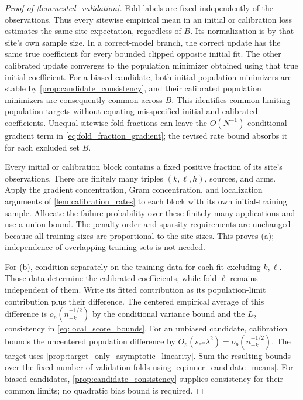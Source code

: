 \documentclass[12pt]{article}
\begin{document}
\begin{proof}[Proof of \cref{lem:nested_validation}]
Fold labels are fixed independently of the observations. Thus every sitewise empirical mean in an initial or calibration loss estimates the same site expectation, regardless of $B$. Its normalization is by that site's own sample size. In a correct-model branch, the correct update has the same true coefficient for every bounded clipped opposite initial fit. The other calibrated update converges to the population minimizer obtained using that true initial coefficient. For a biased candidate, both initial population minimizers are stable by \cref{prop:candidate_consistency}, and their calibrated population minimizers are consequently common across $B$. This identifies common limiting population targets without equating misspecified initial and calibrated coefficients. Unequal sitewise fold fractions can leave the $O(N^{-1})$ conditional-gradient term in \cref{eq:fold_fraction_gradient}; the revised rate bound absorbs it for each excluded set $B$.

Every initial or calibration block contains a fixed positive fraction of its site's observations. There are finitely many triples $(k,\ell,h)$, sources, and arms. Apply the gradient concentration, Gram concentration, and localization arguments of \cref{lem:calibration_rates} to each block with its own initial-training sample. Allocate the failure probability over these finitely many applications and use a union bound. The penalty order and sparsity requirements are unchanged because all training sizes are proportional to the site sizes. This proves (a); independence of overlapping training sets is not needed.

For (b), condition separately on the training data for each fit excluding $k,\ell$. Those data determine the calibrated coefficients, while fold $\ell$ remains independent of them. Write its fitted contribution as its population-limit contribution plus their difference. The centered empirical average of this difference is $o_p(n_{-k}^{-1/2})$ by the conditional variance bound and the $L_2$ consistency in \cref{eq:local_score_bounds}. For an unbiased candidate, calibration bounds the uncentered population difference by $O_p(s_{\mathrm{eff}}\lambda^2)=o_p(n_{-k}^{-1/2})$. The target uses \cref{prop:target_only_asymptotic_linearity}. Sum the resulting bounds over the fixed number of validation folds using \cref{eq:inner_candidate_means}. For biased candidates, \cref{prop:candidate_consistency} supplies consistency for their common limits; no quadratic bias bound is required.


\end{proof}
\end{document}
